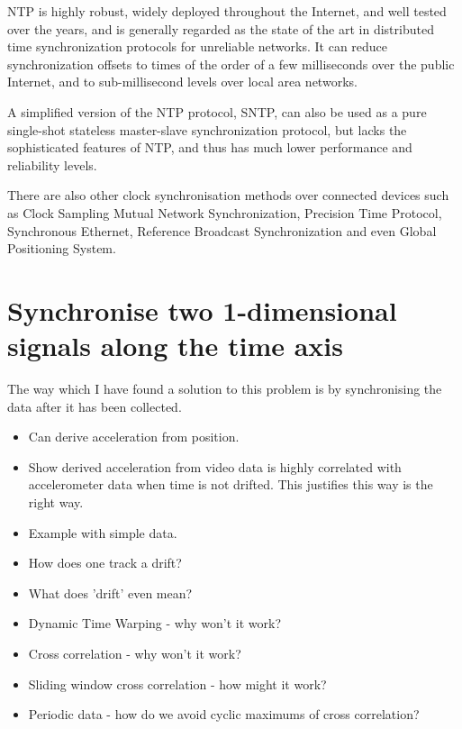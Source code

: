 NTP is highly robust, widely deployed throughout the Internet, and well tested over the years, and is generally regarded as the state of the art in distributed time synchronization protocols for unreliable networks. It can reduce synchronization
offsets to times of the order of a few milliseconds over the public Internet, and to sub-millisecond levels over local area networks.

A simplified version of the NTP protocol, SNTP, can also be used as a pure single-shot stateless master-slave synchronization protocol, but lacks the sophisticated features of NTP, and thus has much lower performance and reliability levels. \cite{wikipedia_clock_synchronisation}

There are also other clock synchronisation methods over connected devices such as Clock Sampling Mutual Network Synchronization, Precision Time Protocol, Synchronous Ethernet, Reference Broadcast Synchronization and even Global Positioning System.

\section{Synchronise two 1-dimensional signals along the time axis}
The way which I have found a solution to this problem is by synchronising the data after it has been collected. 
\begin{itemize}
    \item Can derive acceleration from position.
    \item Show derived acceleration from video data is highly correlated with accelerometer data when time is not drifted. This justifies this way is the right way.
    \item Example with simple data.
    \item How does one track a drift?
    \item What does 'drift' even mean?
    \item Dynamic Time Warping - why won't it work?
    \item Cross correlation - why won't it work?
    \item Sliding window cross correlation - how might it work?
    \item Periodic data - how do we avoid cyclic maximums of cross correlation?
\end{itemize}
